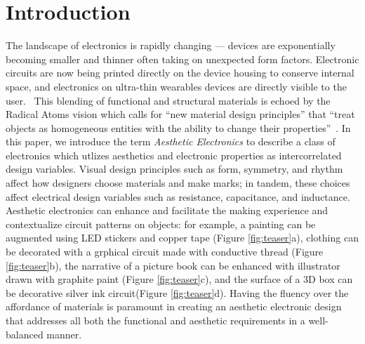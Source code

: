 \documentclass{sigchi}
\begin{document}

\section{Introduction}
The landscape of electronics is rapidly changing --- devices are exponentially becoming smaller and thinner often taking on unexpected form factors. Electronic circuits are now being printed directly on the device housing to conserve internal space, and electronics on ultra-thin wearables devices are directly visible to the user.~\cite{MacDonald:2014ju,Kim:2014iq}
This blending of functional and structural materials is echoed by the Radical Atoms vision which calls for ``new material design principles'' that ``treat objects as homogeneous entities with the ability to change their properties''~\cite{Ishii:2012fg}.  
In this paper, we introduce the term \textit{Aesthetic Electronics} to describe a class of electronics which utlizes aesthetics and electronic properties as intercorrelated design variables. Visual design principles such as form, symmetry, and rhythm affect how designers choose materials and make marks; in tandem, these choices affect electrical design variables such as resistance, capacitance, and inductance.
Aesthetic electronics can enhance and facilitate the making experience and contextualize circuit patterns on objects: for example, a painting can be augmented using LED stickers and copper tape (Figure \ref{fig:teaser}a), clothing can be decorated with a grphical circuit made with conductive thread (Figure \ref{fig:teaser}b), the narrative of a picture book can be enhanced with illustrator drawn with graphite paint (Figure \ref{fig:teaser}c), and the surface of a 3D box can be decorative silver ink circuit(Figure \ref{fig:teaser}d).
Having the fluency over the affordance of materials is paramount in creating an aesthetic electronic design that addresses all both the functional and aesthetic requirements in a well-balanced manner. 
\end{document}
